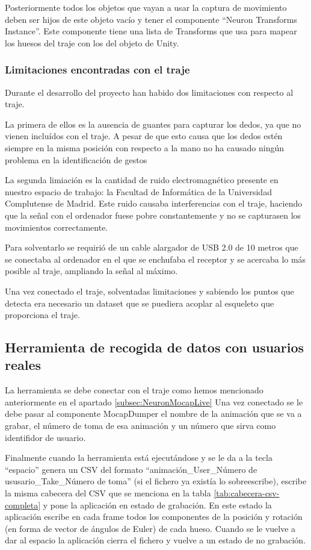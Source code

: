 Posteriormente todos los objetos que vayan a usar la captura de movimiento deben ser hijos de este objeto vacío y tener el componente ``Neuron Transforms Instance''.
Este componente tiene una lista de Transforms que usa para mapear los huesos del traje con los del objeto de Unity.

\subsubsection{Limitaciones encontradas con el traje}
Durante el desarrollo del proyecto han habido dos limitaciones con respecto al traje.

La primera de ellos es la ausencia de guantes para capturar los dedos, ya que no vienen incluídos con el traje.
A pesar de que esto causa que los dedos estén siempre en la misma posición con respecto a la mano no ha causado ningún problema en la identificación de gestos

La segunda limiación es la cantidad de ruido electromagnético presente en nuestro espacio de trabajo: la Facultad de Informática de la Universidad Complutense de Madrid.
Este ruido causaba interferencias con el traje, haciendo que la señal con el ordenador fuese pobre constantemente y no se capturasen los movimientos correctamente.

Para solventarlo se requirió de un cable alargador de USB 2.0 de 10 metros que se conectaba al ordenador en el que se enchufaba el receptor y se acercaba lo más posible al traje, ampliando la señal al máximo.

Una vez conectado el traje, solventadas limitaciones y sabiendo los puntos que detecta era necesario un dataset que se puediera acoplar al esqueleto que proporciona el traje.

\subsection{Herramienta de recogida de datos con usuarios reales}
La herramienta se debe conectar con el traje como hemos mencionado anteriormente en el apartado \ref{subsec:NeuronMocapLive}
Una vez conectado se le debe pasar al componente MocapDumper el nombre de la animación que se va a grabar, el número de toma de esa animación y un número que sirva como identifidor de usuario.

Finalmente cuando la herramienta está ejecutándose y se le da a la tecla ``espacio'' genera un CSV del formato ``animación\_User\_Número de ususario\_Take\_Número de toma'' (si el fichero ya existía lo sobreescribe), escribe la misma cabecera del CSV que se menciona en la tabla \ref{tab:cabecera-csv-completa} y pone la aplicación en estado de grabación.
En este estado la aplicación escribe en cada frame todos los componentes de la posición y rotación (en forma de vector de ángulos de Euler) de cada hueso.
Cuando se le vuelve a dar al espacio la aplicación cierra el fichero y vuelve a un estado de no grabación.

